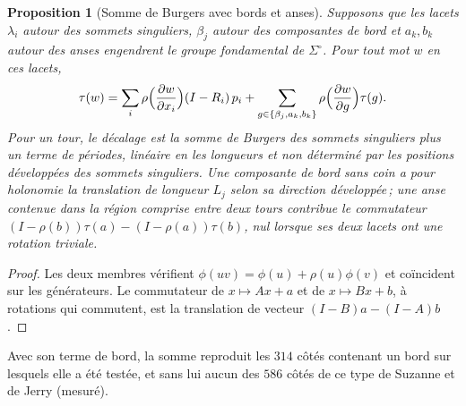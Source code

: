 \documentclass[11pt,a4paper]{article}
\newtheorem{proposition}{Proposition}
\newcommand{\lean}[1]{\texttt{\detokenize{#1}}}
\newenvironment{evidence}[3][]{}{}
\begin{document}
\begin{evidence}{core}{\lean{fox_general}, \lean{holGen_rotations}, \lean{commutator_motion}\,; supposé~: la présentation du groupe fondamental par les lacets nommés}
\begin{proposition}[Somme de Burgers avec bords et anses]\label{prop:burgers-any}
Supposons que les lacets $\lambda_i$ autour des sommets singuliers, $\beta_j$
autour des composantes de bord et $a_k, b_k$ autour des anses engendrent le
groupe fondamental de $\Sigma^\circ$. Pour tout mot $w$ en ces lacets,
\[
  \tau(w) = \sum_i \rho\Bigl(\frac{\partial w}{\partial x_i}\Bigr)(I - R_i)\,p_i
  + \sum_{g \in \{\beta_j, a_k, b_k\}} \rho\Bigl(\frac{\partial w}{\partial g}\Bigr)\tau(g).
\]
Pour un tour, le décalage est la somme de Burgers des sommets singuliers plus
un \emph{terme de périodes}, linéaire en les longueurs et non déterminé par
les positions développées des sommets singuliers. Une composante de bord sans
coin a pour holonomie la translation de longueur $L_j$ selon sa direction
développée\,; une anse contenue dans la région comprise entre deux tours
contribue le commutateur $(I - \rho(b))\tau(a) - (I - \rho(a))\tau(b)$, nul
lorsque ses deux lacets ont une rotation triviale.
\end{proposition}
\end{evidence}
\begin{proof}
Les deux membres vérifient $\phi(uv) = \phi(u) + \rho(u)\phi(v)$ et
coïncident sur les générateurs. Le commutateur de $x \mapsto Ax + a$ et de $x
\mapsto Bx + b$, à rotations qui commutent, est la translation de vecteur $(I
- B)a - (I - A)b$.
\end{proof}

Avec son terme de bord, la somme reproduit les $314$ côtés contenant un bord
sur lesquels elle a été testée, et sans lui aucun des $586$ côtés de ce type
de Suzanne et de Jerry (mesuré).
\end{document}
